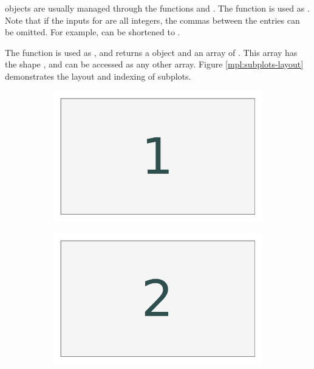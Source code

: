  objects are usually managed through the functions  and .
The function  is used as .
Note that if the inputs for  are all integers, the commas between the entries can be omitted.
For example,  can be shortened to .

The function  is used as , and returns a  object and an array of .
This array has the shape , and can be accessed as any other array.
Figure \ref{mpl:subplots-layout} demonstrates the layout and indexing of subplots.

\begin{figure}[H] %
\captionsetup[subfigure]{justification=centering}
\centering
\begin{framed}
\begin{subfigure}{.32\textwidth}
    \centering
    \includegraphics[width=\linewidth]{figures/layout_1.pdf}
\end{subfigure}
%
\begin{subfigure}{.32\textwidth}
    \centering
    \includegraphics[width=\linewidth]{figures/layout_2.pdf}

\end{subfigure}
\end{framed}
\end{figure}
